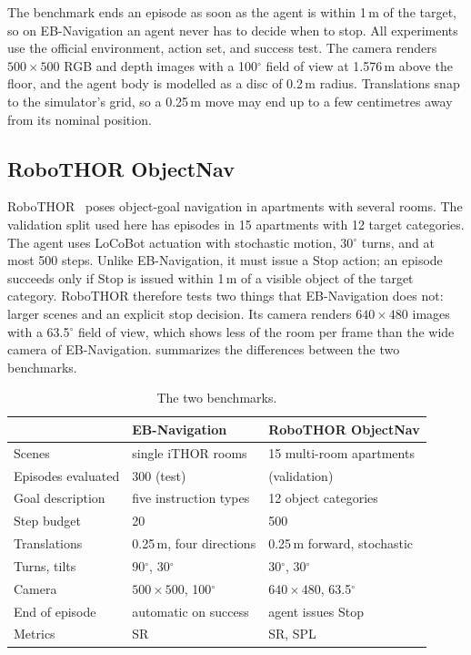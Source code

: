 The benchmark ends an episode as soon as the agent is within 1\,m of the target, so on EB-Navigation an agent never
has to decide when to stop. All experiments use the official environment, action set, and success test. The camera
renders $500{\times}500$ RGB and depth images with a 100$^\circ$ field of view at 1.576\,m above the floor, and the
agent body is modelled as a disc of 0.2\,m radius. Translations snap to the simulator's grid, so a 0.25\,m move may
end up to a few centimetres away from its nominal position.

\subsection{RoboTHOR ObjectNav}
RoboTHOR~\cite{deitke2020robothor} poses object-goal navigation in apartments with several rooms. The validation
split used here has \nRoboN{} episodes in 15 apartments with 12 target categories. The agent uses LoCoBot actuation
with stochastic motion, 30$^\circ$ turns, and at most 500 steps. Unlike EB-Navigation, it must issue a Stop action;
an episode succeeds only if Stop is issued within 1\,m of a visible object of the target category. RoboTHOR therefore
tests two things that EB-Navigation does not: larger scenes and an explicit stop decision. Its camera renders
$640{\times}480$ images with a 63.5$^\circ$ field of view, which shows less of the room per frame than the wide
camera of EB-Navigation.  summarizes the differences between the two benchmarks.

\begin{table}[htbp]
\centering\small
\caption{The two benchmarks.}
\label{tab:bench-compare}
\begin{tabular*}{\linewidth}{@{\extracolsep{\fill}}lll@{}}
\toprule
 & EB-Navigation & RoboTHOR ObjectNav\\
\midrule
Scenes & single iTHOR rooms & 15 multi-room apartments\\
Episodes evaluated & 300 (test) & \nRoboN{} (validation)\\
Goal description & five instruction types & 12 object categories\\
Step budget & 20 & 500\\
Translations & 0.25\,m, four directions & 0.25\,m forward, stochastic\\
Turns, tilts & 90$^\circ$, 30$^\circ$ & 30$^\circ$, 30$^\circ$\\
Camera & $500{\times}500$, 100$^\circ$ & $640{\times}480$, 63.5$^\circ$\\
End of episode & automatic on success & agent issues Stop\\
Metrics & SR & SR, SPL\\
\bottomrule
\end{tabular*}
\end{table}

